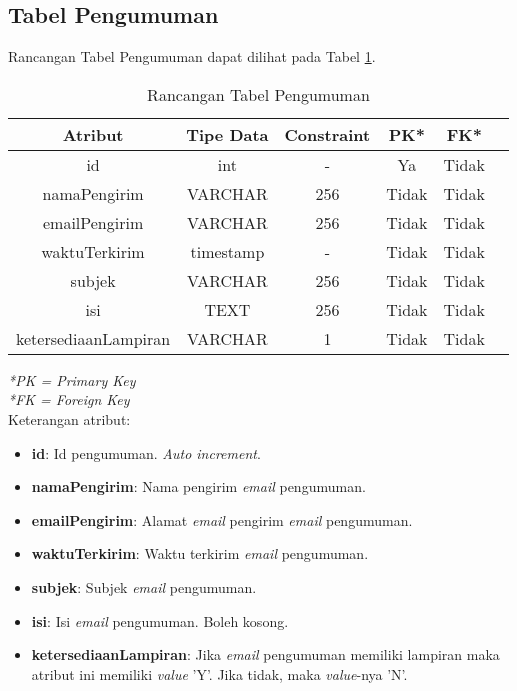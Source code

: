 \subsection{Tabel Pengumuman}
Rancangan Tabel Pengumuman dapat dilihat pada Tabel \ref{table:rancangan-tabel-pengumuman}.
\begin{table}[H]
	\caption{Rancangan Tabel Pengumuman}
	\label{table:rancangan-tabel-pengumuman}
	\centering
	\begin{tabular}{|c|c|c|c|c|c|}
 			\hline
			\textbf{Atribut} & \textbf{Tipe Data} & \textbf{Constraint} & \textbf{PK*}  & \textbf{FK*} \\
			\hline
		 	 id & int & - & Ya & Tidak\\
			\hline
			 namaPengirim & VARCHAR & 256 & Tidak & Tidak\\
            \hline
			 emailPengirim & VARCHAR & 256 & Tidak & Tidak\\
            \hline
			 waktuTerkirim & timestamp & - & Tidak & Tidak\\
            \hline
			 subjek & VARCHAR & 256 & Tidak & Tidak\\
            \hline
			 isi & TEXT & 256 & Tidak & Tidak\\
            \hline
			 ketersediaanLampiran & VARCHAR & 1 & Tidak & Tidak\\
			\hline
	\end{tabular}
\end{table}
\noindent \textit{*PK = Primary Key} \\
\textit{*FK = Foreign Key} \\

Keterangan atribut:
\begin{itemize}
\item \textbf{id}: Id pengumuman. \textit{Auto increment}.
\item \textbf{namaPengirim}: Nama pengirim \textit{email} pengumuman.
\item \textbf{emailPengirim}: Alamat \textit{email} pengirim \textit{email} pengumuman.
\item \textbf{waktuTerkirim}: Waktu terkirim \textit{email} pengumuman.
\item \textbf{subjek}: Subjek \textit{email} pengumuman.
\item \textbf{isi}: Isi \textit{email} pengumuman. Boleh kosong.
\item \textbf{ketersediaanLampiran}: Jika \textit{email} pengumuman memiliki lampiran maka atribut ini memiliki \textit{value} 'Y'. Jika tidak, maka \textit{value}-nya 'N'.
\end{itemize}


